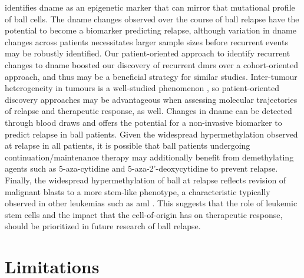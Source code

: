  identifies \gls{dname} as an epigenetic marker that can mirror that mutational profile of \gls{ball} cells.
The \gls{dname} changes observed over the course of \gls{ball} relapse have the potential to become a biomarker predicting relapse, although variation in \gls{dname} changes across patients necessitates larger sample sizes before recurrent events may be robustly identified.
Our patient-oriented approach to identify recurrent changes to \gls{dname} boosted our discovery of recurrent \glspl{dmr} over a cohort-oriented approach, and thus may be a beneficial strategy for similar studies.
Inter-tumour heterogeneity in tumours is a well-studied phenomenon \cite{marusykTumorHeterogeneityCauses2010,sottorivaCatchMyDrift2017,huangGeneticNongeneticInstability2013,mcgranahanBiologicalTherapeuticImpact2015,landauChronicLymphocyticLeukemia2013,ben-davidGeneticTranscriptionalEvolution2018,carterEpigeneticBasisCellular2021}, so patient-oriented discovery approaches may be advantageous when assessing molecular trajectories of relapse and therapeutic response, as well.
Changes in \gls{dname} can be detected through blood draws \cite{peterDynamicsCellfreeDNA2020,shenSensitiveTumourDetection2018,nassiriDetectionDiscriminationIntracranial2020} and offers the potential for a non-invasive biomarker to predict relapse in \gls{ball} patients.
Given the widespread hypermethylation observed at relapse in all patients, it is possible that \gls{ball} patients undergoing continuation/maintenance therapy may additionally benefit from demethylating agents such as 5-aza-cytidine and 5-aza-2'-deoxycytidine to prevent relapse.
Finally, the widespread hypermethylation of \gls{ball} at relapse reflects revision of malignant blasts to a more stem-like phenotype, a characteristic typically observed in other leukemias such as \gls{aml} \cite{krivtsovMLLTranslocationsHistone2007,liClinicalImplicationsGenomewide2017,kresoEvolutionCancerStem2014,shlushIdentificationPreleukaemicHaematopoietic2014,shlushTracingOriginsRelapse2017}.
This suggests that the role of leukemic stem cells and the impact that the cell-of-origin has on therapeutic response, should be prioritized in future research of \gls{ball} relapse.

\section{Limitations}

